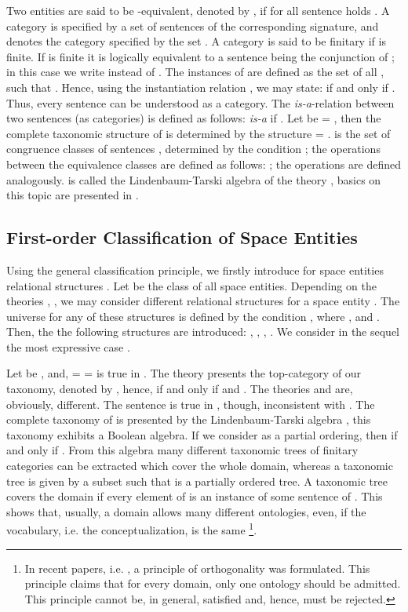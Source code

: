 \documentclass{ao2e}
\begin{document}
{Two entities  are said to be -equivalent, denoted by ,  if for all sentence  holds . A category  is specified by a set  of sentences of the corresponding signature, and  denotes the category specified by the set . A category  is said to be finitary if  is finite. If  is finite  it is logically equivalent to a sentence  being the conjunction of ; in this case we write  instead of .
The instances of  are defined as the set of all , such that . Hence, using the instantiation relation , we may state:  if and only if . Thus, every sentence  can be understood as a category.
The {\it is-a}-relation between two sentences (as categories) is defined as follows:  {\it is-a}  if
. Let be  = ,
then the complete taxonomic structure of  is determined by the structure   = .  is the set of congruence
classes  of sentences , determined by the condition ; the operations between the equivalence classes are defined as follows:
; the operations  are defined analogously.  is called the Lindenbaum-Tarski algebra of the theory , basics on this topic are presented in \cite{hinman-p-2005-a}.


\subsection{First-order Classification of Space Entities}

Using the general classification principle, we firstly introduce for space entities  relational structures
. Let be  the class of all space entities. Depending on the theories , 
, we may consider different relational structures  for a space entity .
The universe  for any of these structures is defined by the condition 
, where , and
. Then, the the following structures are introduced:
, , 
,  . We consider
in the sequel the most expressive case .

Let be , and,
 =  =  is true in .
The theory  presents the top-category of our taxonomy, denoted by , hence,
 if and only if  and . The theories 
 and  are, obviously, different. The sentence  is true in , though, inconsistent with . The complete taxonomy of  is 
presented by the Lindenbaum-Tarski algebra , this taxonomy exhibits a Boolean
algebra. If we consider  as a partial ordering, then  if and only if
.  From this algebra many different taxonomic trees of finitary categories can be extracted which cover the whole domain, whereas a taxonomic tree is given by a subset  such that
 is a partially ordered tree. A taxonomic tree  covers the domain  if every element of  is an instance of
some sentence of . This shows that, usually, a domain allows many different ontologies, even, if the vocabulary, i.e. the conceptualization,  is the same \footnote{In recent papers, i.e. \cite{smith-b-2008-a}, a principle of orthogonality was formulated. This principle claims that for every domain, only one ontology should be admitted. This principle cannot be, in general, satisfied and, hence, must be rejected.}.

}
\end{document}
